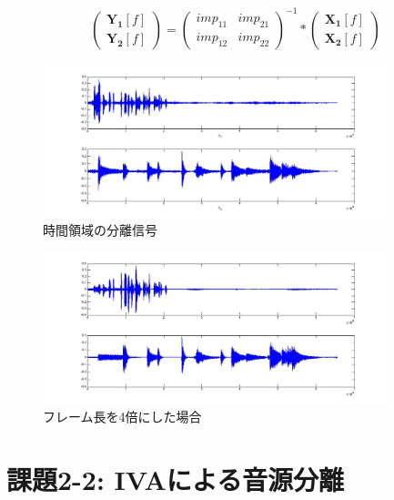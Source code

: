 \documentclass[a4j]{jarticle}
\begin{document}
\begin{eqnarray}
 \left(
 \begin{array}{cc}
  \bm{Y_1}[f]\\
  \bm{Y_2}[f]
 \end{array}
\right)
=
\left(
 \begin{array}{cc}
  imp_{11} & imp_{21}\\
  imp_{12} & imp_{22}
 \end{array}
\right)^{-1}
*
\left(
 \begin{array}{cc}
  \bm{X_1}[f]\\
  \bm{X_2}[f]
 \end{array}
\right)
\end{eqnarray}

\begin{figure}[htb]
 \begin{center}
  \includegraphics[width=10cm, clip, bb=0 0 1152 510]{pic/k212.jpg}
  \caption{時間領域の分離信号}
  \label{k212}
 \end{center}
\end{figure}

\begin{figure}[htb]
 \begin{center}
  \includegraphics[width=10cm, clip, bb=0 0 1152 508]{pic/k212long.jpg}
  \caption{フレーム長を4倍にした場合}
  \label{k212long}
 \end{center}
\end{figure}

\section{課題2-2: IVAによる音源分離}
\end{document}
